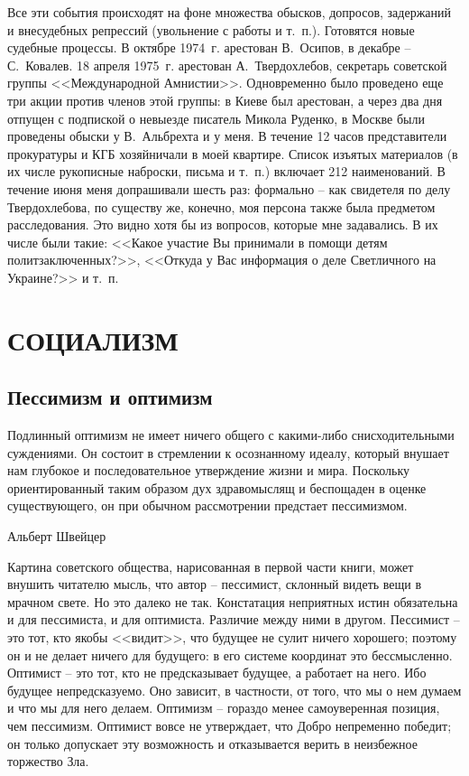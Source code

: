 \documentclass{book}
\newcommand{\MyEndNote}[1]{%
	\newpage
	\renewcommand\notesname{#1}
	\theendnotes
	\addcontentsline{toc}{section}{#1}
	\setcounter{endnote}{0}
}
\begin{document}
Все эти события происходят на фоне множества обысков, допросов, задержаний и внесудебных репрессий (увольнение с работы и т.~п.). Готовятся новые судебные процессы. В октябре 1974~г. арестован В.~Осипов, в декабре -- С.~Ковалев. 18 апреля 1975~г. арестован А.~Твердохлебов, секретарь советской группы <<Международной Амнистии>>. Одновременно было проведено еще три акции против членов этой группы: в Киеве был арестован, а через два дня отпущен с подпиской о невыезде писатель Микола Руденко, в Москве были проведены обыски у В.~Альбрехта и у меня. В течение 12 часов представители прокуратуры и КГБ хозяйничали в моей квартире. Список изъятых материалов (в их числе рукописные наброски, письма и т.~п.) включает 212 наименований. В течение июня меня допрашивали шесть раз: формально -- как свидетеля по делу Твердохлебова, по существу же, конечно, моя персона также была предметом расследования. Это видно хотя бы из вопросов, которые мне задавались. В их числе были такие: <<Какое участие Вы принимали в помощи детям 
политзаключенных?>>, <<Откуда у Вас информация о деле Светличного на Украине?>> и т.~п.%

\MyEndNote{Ссылки и примечания к первой части}

\chapter{СОЦИАЛИЗМ}

\section{Пессимизм и оптимизм}
\epigraph{Подлинный оптимизм не имеет ничего общего с какими-либо снисходительными суждениями. Он состоит в стремлении к осознанному идеалу, который внушает нам глубокое и последовательное утверждение жизни и мира. Поскольку ориентированный таким образом дух здравомыслящ и беспощаден в оценке существующего, он при обычном рассмотрении предстает пессимизмом.}{Альберт Швейцер}

Картина советского общества, нарисованная в первой части книги, может внушить читателю мысль, что автор -- пессимист, склонный видеть вещи в мрачном свете. Но это далеко не так. Констатация неприятных истин обязательна и для пессимиста, и для оптимиста. Различие между ними в другом. Пессимист -- это тот, кто якобы <<видит>>, что будущее не сулит ничего хорошего; поэтому он и не делает ничего для будущего: в его системе координат это бессмысленно. Оптимист -- это тот, кто не предсказывает будущее, а работает на него. Ибо будущее непредсказуемо. Оно зависит, в частности, от того, что мы о нем думаем и что мы для него делаем. Оптимизм -- гораздо менее самоуверенная позиция, чем пессимизм. Оптимист вовсе не утверждает, что Добро непременно победит; он только допускает эту возможность и отказывается верить в неизбежное торжество Зла.
\end{document}
